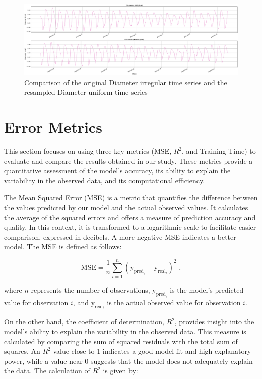 \begin{figure}[htbp]
    \centering
    \includegraphics[width=15 cm]{5_ChapterDesign/figuras/5_Irregular/comparison_Diameter.pdf}
    \caption{Comparison of the original Diameter irregular time series and the resampled Diameter uniform time series}
    \label{comparison_Diameter}
\end{figure}

\section{Error Metrics}

This section focuses on using three key metrics (MSE, \( R^2 \), and Training Time) to evaluate and compare the results obtained in our study. These metrics provide a quantitative assessment of the model's accuracy, its ability to explain the variability in the observed data, and its computational efficiency.

The Mean Squared Error (MSE) is a metric that quantifies the difference between the values predicted by our model and the actual observed values. It calculates the average of the squared errors and offers a measure of prediction accuracy and quality. In this context, it is transformed to a logarithmic scale to facilitate easier comparison, expressed in decibels. A more negative MSE indicates a better model. The MSE is defined as follows:

\begin{equation}
    \text{MSE} = \frac{1}{n} \sum_{i=1}^{n} \left( \text{y}_{\text{pred}_i} - \text{y}_{\text{real}_i} \right)^2  \text{ ,}
\end{equation}
    
where \( n \) represents the number of observations, \( \text{y}_{\text{pred}_i} \) is the model's predicted value for observation \( i \), and \( \text{y}_{\text{real}_i} \) is the actual observed value for observation \( i \).

On the other hand, the coefficient of determination, \( R^2 \), provides insight into the model's ability to explain the variability in the observed data. This measure is calculated by comparing the sum of squared residuals with the total sum of squares. An \( R^2 \) value close to 1 indicates a good model fit and high explanatory power, while a value near 0 suggests that the model does not adequately explain the data. The calculation of \( R^2 \) is given by:

